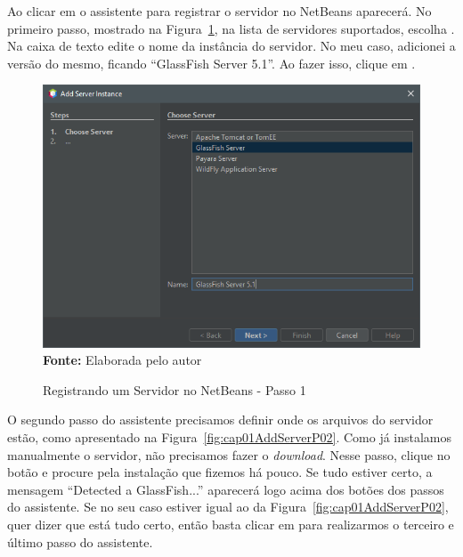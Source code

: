 Ao clicar em  o assistente para registrar o servidor no NetBeans aparecerá. No primeiro passo, mostrado na Figura~\ref{fig:cap01AddServerP01}, na lista de servidores suportados, escolha . Na caixa de texto  edite o nome da instância do servidor. No meu caso, adicionei a versão do mesmo, ficando ``GlassFish Server 5.1''. Ao fazer isso, clique em .

\FloatBarrier
\begin{figure}[!htbp]
    \centering
    \caption{Registrando um Servidor no NetBeans - Passo 1}
    \includegraphics[scale=0.7]{imagens/cap01AddServerInstanceP01}
    \\\textbf{Fonte:} Elaborada pelo autor
    \label{fig:cap01AddServerP01}
\end{figure}
\FloatBarrier

O segundo passo do assistente precisamos definir onde os arquivos do servidor estão, como apresentado na Figura~\ref{fig:cap01AddServerP02}. Como já instalamos manualmente o servidor, não precisamos fazer o \textit{download}. Nesse passo, clique no botão  e procure pela instalação que fizemos há pouco. Se tudo estiver certo, a mensagem ``Detected a GlassFish...'' aparecerá logo acima dos botões dos passos do assistente. Se no seu caso estiver igual ao da Figura~\ref{fig:cap01AddServerP02}, quer dizer que está tudo certo, então basta clicar em  para realizarmos o terceiro e último passo do assistente.

